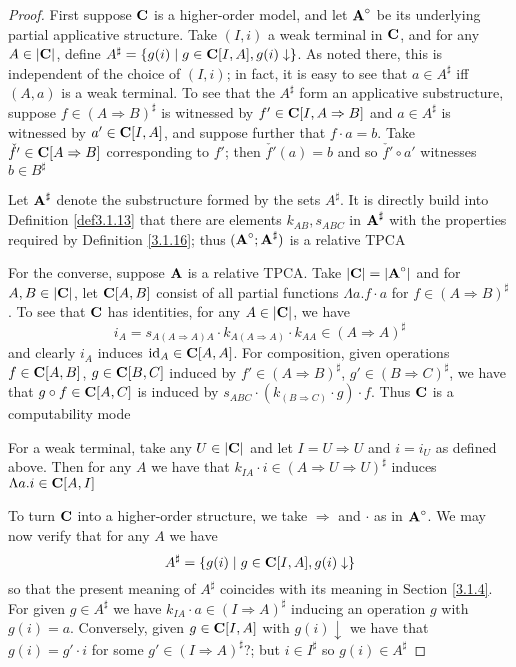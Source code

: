 \documentclass[11pt]{article}
\begin{document}
\begin{proof}
First suppose \(\operatorname{\textbf{C}}\) is a higher-order model, and let \(\operatorname{\textbf{A}}^\circ\) be its underlying partial
applicative structure. Take \((I,i)\) a weak terminal in \(\operatorname{\textbf{C}}\), and for any \(A\in\abs{\bC}\),
define \(A^\sharp=\{g(i)\mid g\in\operatorname{\textbf{C}}[I,A],g(i)\downarrow\}\). As noted there, this is independent of the choice
of \((I,i)\); in fact, it is easy to see that \(a\in A^\sharp\) iff \((A,a)\) is a weak terminal. To
see that the \(A^\sharp\) form an applicative substructure, suppose \(f\in(A\Rightarrow B)^\sharp\) is witnessed
by \(f'\in\operatorname{\textbf{C}}[I,A\Rightarrow B]\) and \(a\in A^\sharp\) is witnessed by \(a'\in\operatorname{\textbf{C}}[I,A]\), and suppose further
that \(f\cdot a=b\). Take \(\check{f'}\in\operatorname{\textbf{C}}[A\Rightarrow B]\) corresponding to \(f'\); then \(\check{f'}(a)=b\)
and so \(\check{f'}\circ a'\) witnesses \(b\in B^\sharp\)

Let \(\operatorname{\textbf{A}}^\sharp\) denote the substructure formed by the sets \(A^\sharp\). It is directly build into
Definition \ref{def3.1.13} that there are elements \(k_{AB}, s_{ABC}\) in \(\operatorname{\textbf{A}}^\sharp\) with the
properties required by Definition \ref{3.1.16}; thus \((\operatorname{\textbf{A}}^\circ;\operatorname{\textbf{A}}^\sharp)\) is a relative TPCA

For the converse, suppose \(\operatorname{\textbf{A}}\) is a relative TPCA. Take \(\abs{\bC}=\abs{\bA^\circ}\) and
for \(A,B\in\abs{\bC}\), let \(\operatorname{\textbf{C}}[A,B]\) consist of all partial functions \(\Lambda a.f\cdot a\)
for \(f\in(A\Rightarrow B)^\sharp\). To see that \(\operatorname{\textbf{C}}\) has identities, for any \(A\in\abs{\bC}\), we have
\begin{equation*}
i_A=s_{A(A\Rightarrow A)A}\cdot k_{A(A\Rightarrow A)}\cdot k_{AA}\in(A\Rightarrow A)^\sharp
\end{equation*}
and clearly \(i_A\) induces \(\operatorname{id}_A\in\operatorname{\textbf{C}}[A,A]\).  For composition, given
operations \(f\in\operatorname{\textbf{C}}[A,B]\), \(g\in\operatorname{\textbf{C}}[B,C]\) induced by \(f'\in(A\Rightarrow B)^\sharp\), \(g'\in(B\Rightarrow C)^\sharp\), we have
that \(g\circ f\in\operatorname{\textbf{C}}[A,C]\) is induced by \(s_{ABC}\cdot(k_{(B\Rightarrow C)}\cdot g)\cdot f\). Thus \(\operatorname{\textbf{C}}\) is a computability
mode

For a weak terminal, take any \(U\in\abs{\bC}\) and let \(I=U\Rightarrow U\) and \(i=i_U\) as defined above.
Then for any \(A\) we have that \(k_{IA}\cdot i\in(A\Rightarrow U\Rightarrow U)^\sharp\) induces \(\Lambda a.i\in\operatorname{\textbf{C}}[A,I]\)

To turn \(\operatorname{\textbf{C}}\) into a higher-order structure, we take \(\Rightarrow\) and \(\cdot\) as in \(\operatorname{\textbf{A}}^\circ\). We may now
verify that for any \(A\) we have
\begin{equation*}
A^\sharp=\{g(i)\mid g\in\operatorname{\textbf{C}}[I,A],g(i)\downarrow\}
\end{equation*}
so that the present meaning of \(A^\sharp\) coincides with its meaning in Section \ref{3.1.4}. For
given \(g\in A^\sharp\) we have \(k_{IA}\cdot a\in(I\Rightarrow A)^\sharp\) inducing an operation \(g\) with \(g(i)=a\).
Conversely, given \(g\in\operatorname{\textbf{C}}[I,A]\) with \(g(i)\downarrow\) we have that \(g(i)=g'\cdot i\) for
some \(g'\in(I\Rightarrow A)^\sharp\)?; but \(i\in I^\sharp\) so \(g(i)\in A^\sharp\)


\end{proof}
\end{document}
